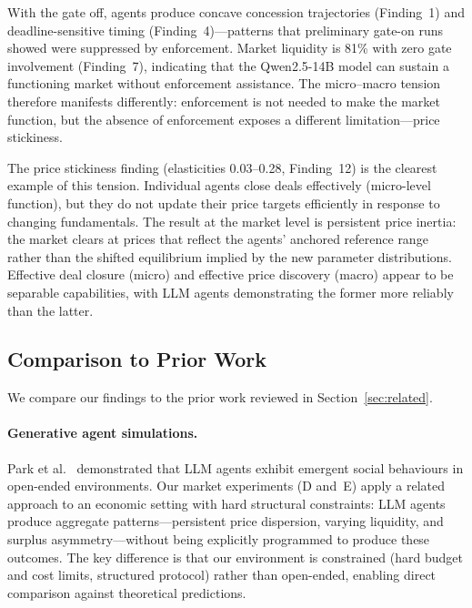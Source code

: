 With the gate off, agents produce concave concession trajectories (Finding~1) and deadline-sensitive timing (Finding~4)---patterns that preliminary gate-on runs showed were suppressed by enforcement.  Market liquidity is 81\% with zero gate involvement (Finding~7), indicating that the Qwen2.5-14B model can sustain a functioning market without enforcement assistance.  The micro--macro tension therefore manifests differently: enforcement is not needed to make the market function, but the absence of enforcement exposes a different limitation---price stickiness.

The price stickiness finding (elasticities 0.03--0.28, Finding~12) is the clearest example of this tension.  Individual agents close deals effectively (micro-level function), but they do not update their price targets efficiently in response to changing fundamentals.  The result at the market level is persistent price inertia: the market clears at prices that reflect the agents' anchored reference range rather than the shifted equilibrium implied by the new parameter distributions.  Effective deal closure (micro) and effective price discovery (macro) appear to be separable capabilities, with LLM agents demonstrating the former more reliably than the latter.

\subsection{Comparison to Prior Work}
\label{sec:disc-prior}

We compare our findings to the prior work reviewed in Section~\ref{sec:related}.

\paragraph{Generative agent simulations.}
Park et al.~\cite{park2023generative} demonstrated that LLM agents exhibit emergent social behaviours in open-ended environments.  Our market experiments (D and~E) apply a related approach to an economic setting with hard structural constraints: LLM agents produce aggregate patterns---persistent price dispersion, varying liquidity, and surplus asymmetry---without being explicitly programmed to produce these outcomes.  The key difference is that our environment is constrained (hard budget and cost limits, structured protocol) rather than open-ended, enabling direct comparison against theoretical predictions.

